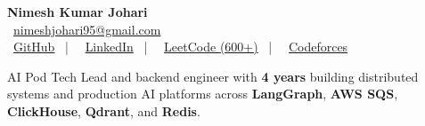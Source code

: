 \documentclass[a4paper,10pt]{article}
\begin{document}
\begin{center}
  {\LARGE \textbf{Nimesh Kumar Johari}} \\
  \faAt\ \href{mailto:nimeshjohari95@gmail.com}{nimeshjohari95@gmail.com} \\
  \faGithub\ \href{https://github.com/NimeshJohari02}{GitHub} ~|~
  \faLinkedin\ \href{https://www.linkedin.com/in/nimeshjohari02/}{LinkedIn} ~|~
  \faCode\ \href{https://leetcode.com/nimeshjohari02/}{LeetCode (600+)} ~|~
  \faCode\ \href{https://codeforces.com/profile/nimesh_02}{Codeforces}
\end{center}
\vspace{-4pt}
\begin{center}
\small AI Pod Tech Lead and backend engineer with \textbf{4 years} building distributed systems and production AI platforms across \textbf{LangGraph}, \textbf{AWS SQS}, \textbf{ClickHouse}, \textbf{Qdrant}, and \textbf{Redis}.
\end{center}
\vspace{-10pt}
\end{document}
